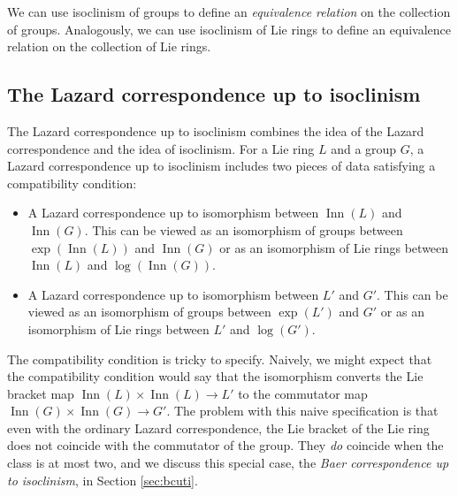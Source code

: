 We can use isoclinism of groups to define an {\em equivalence
  relation} on the collection of groups. Analogously, we can use
isoclinism of Lie rings to define an equivalence relation on the
collection of Lie rings.

\subsection{The Lazard correspondence up to isoclinism}

The Lazard correspondence up to isoclinism combines the idea of the
Lazard correspondence and the idea of isoclinism. For a Lie ring $L$
and a group $G$, a Lazard correspondence up to isoclinism includes two
pieces of data satisfying a compatibility condition:

\begin{itemize}
\item A Lazard correspondence up to isomorphism between
  $\operatorname{Inn}(L)$ and $\operatorname{Inn}(G)$. This can be
  viewed as an isomorphism of groups between
  $\exp(\operatorname{Inn}(L))$ and $\operatorname{Inn}(G)$ or as an
  isomorphism of Lie rings between $\operatorname{Inn}(L)$ and
  $\log(\operatorname{Inn}(G))$.
\item A Lazard correspondence up to isomorphism between $L'$ and
  $G'$. This can be viewed as an isomorphism of groups between
  $\exp(L')$ and $G'$ or as an isomorphism of Lie rings between $L'$
  and $\log(G')$.
\end{itemize}

The compatibility condition is tricky to specify. Naively, we might
expect that the compatibility condition would say that the isomorphism
converts the Lie bracket map $\operatorname{Inn}(L) \times
\operatorname{Inn}(L) \to L'$ to the commutator map
$\operatorname{Inn}(G) \times \operatorname{Inn}(G) \to G'$. The
problem with this naive specification is that even with the ordinary
Lazard correspondence, the Lie bracket of the Lie ring does not
coincide with the commutator of the group. They {\em do} coincide when
the class is at most two, and we discuss this special case, the {\em
  Baer correspondence up to isoclinism}, in Section \ref{sec:bcuti}.


